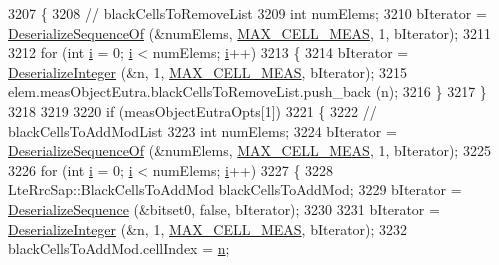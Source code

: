 \begin{DoxyCode}
3207                 \{
3208                   \textcolor{comment}{// blackCellsToRemoveList}
3209                   \textcolor{keywordtype}{int} numElems;
3210                   bIterator = \hyperlink{classns3_1_1Asn1Header_a1a7245e05b482df8abade0a060bd0ecc}{DeserializeSequenceOf} (&numElems, 
      \hyperlink{lte-rrc-header_8cc_a1d57dacc17deb664f3250c8c9bc5ba0e}{MAX\_CELL\_MEAS}, 1, bIterator);
3211 
3212                   \textcolor{keywordflow}{for} (\textcolor{keywordtype}{int} \hyperlink{bernuolliDistribution_8m_a6f6ccfcf58b31cb6412107d9d5281426}{i} = 0; \hyperlink{bernuolliDistribution_8m_a6f6ccfcf58b31cb6412107d9d5281426}{i} < numElems; \hyperlink{bernuolliDistribution_8m_a6f6ccfcf58b31cb6412107d9d5281426}{i}++)
3213                     \{
3214                       bIterator = \hyperlink{classns3_1_1Asn1Header_a49802c9af30018b078150e866b6ecae2}{DeserializeInteger} (&n, 1, 
      \hyperlink{lte-rrc-header_8cc_a1d57dacc17deb664f3250c8c9bc5ba0e}{MAX\_CELL\_MEAS}, bIterator);
3215                       elem.measObjectEutra.blackCellsToRemoveList.push\_back (n);
3216                     \}
3217                 \}
3218 
3219 
3220               \textcolor{keywordflow}{if} (measObjectEutraOpts[1])
3221                 \{
3222                   \textcolor{comment}{// blackCellsToAddModList}
3223                   \textcolor{keywordtype}{int} numElems;
3224                   bIterator = \hyperlink{classns3_1_1Asn1Header_a1a7245e05b482df8abade0a060bd0ecc}{DeserializeSequenceOf} (&numElems, 
      \hyperlink{lte-rrc-header_8cc_a1d57dacc17deb664f3250c8c9bc5ba0e}{MAX\_CELL\_MEAS}, 1, bIterator);
3225 
3226                   \textcolor{keywordflow}{for} (\textcolor{keywordtype}{int} \hyperlink{bernuolliDistribution_8m_a6f6ccfcf58b31cb6412107d9d5281426}{i} = 0; \hyperlink{bernuolliDistribution_8m_a6f6ccfcf58b31cb6412107d9d5281426}{i} < numElems; \hyperlink{bernuolliDistribution_8m_a6f6ccfcf58b31cb6412107d9d5281426}{i}++)
3227                     \{
3228                       LteRrcSap::BlackCellsToAddMod blackCellsToAddMod;
3229                       bIterator = \hyperlink{classns3_1_1Asn1Header_a58c68bb97ba3fe2e8fcdd7c208d672b2}{DeserializeSequence} (&bitset0, \textcolor{keyword}{false}, bIterator);
3230 
3231                       bIterator = \hyperlink{classns3_1_1Asn1Header_a49802c9af30018b078150e866b6ecae2}{DeserializeInteger} (&n, 1, 
      \hyperlink{lte-rrc-header_8cc_a1d57dacc17deb664f3250c8c9bc5ba0e}{MAX\_CELL\_MEAS}, bIterator);
3232                       blackCellsToAddMod.cellIndex = \hyperlink{namespacesample-rng-plot_aeb5ee5c431e338ef39b7ac5431242e1d}{n};

\end{DoxyCode}
